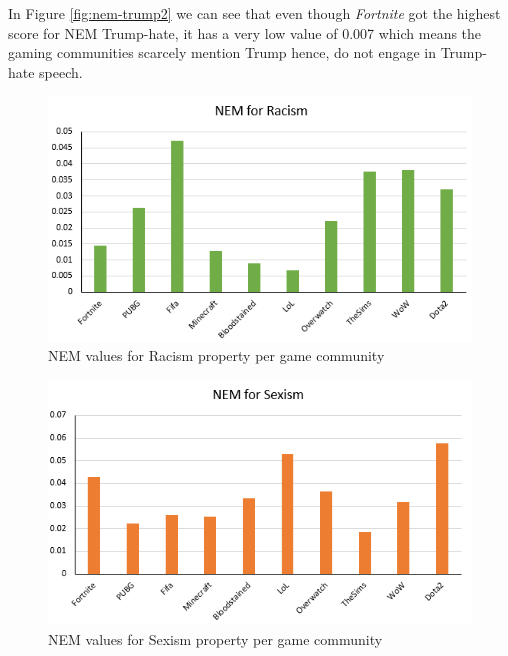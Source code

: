 In Figure \ref{fig:nem-trump2} we can see that even though \emph{Fortnite} got the highest score for NEM Trump-hate, it has a very low value of 0.007 which means the gaming communities scarcely mention Trump hence, do not engage in Trump-hate speech.

\begin{figure}[h]
    \begin{center}
        \includegraphics[scale=0.46]{Images/nem-racism-g.PNG}
    \end{center}
    \caption{NEM values for Racism property per game community}
    \label{fig:nem-racism}
\end{figure}

\begin{figure}[h]
    \begin{center}
        \includegraphics[scale=0.46]{Images/nem-sexism-r.PNG}
    \end{center}
    \caption{NEM values for Sexism property per game community}
    \label{fig:nem-sexism}
\end{figure}

